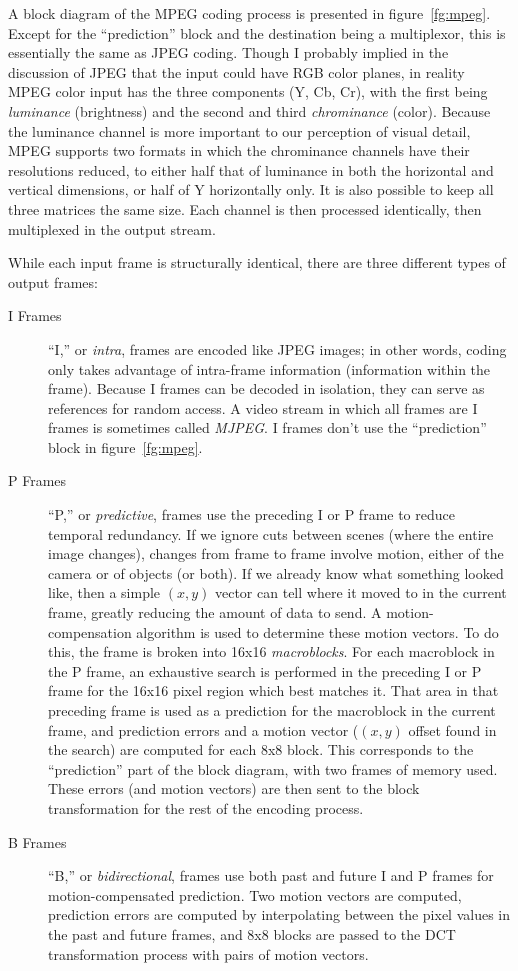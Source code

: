 A block diagram of the MPEG coding process is presented in
figure~\ref{fg:mpeg}. Except for the ``prediction'' block and the
destination being a multiplexor, this is essentially the same as JPEG
coding.  Though I probably implied in the discussion of JPEG that the
input could have RGB color planes, in reality MPEG color input has the
three components (Y, Cb, Cr), with the first being
\emph{luminance} (brightness) and the second and third
\emph{chrominance} (color). Because the luminance channel is more
important to our perception of visual detail, MPEG supports two
formats in which the chrominance channels have their resolutions
reduced, to either half that of luminance in both the horizontal and
vertical dimensions, or half of Y horizontally only. It is also
possible to keep all three matrices the same size. Each channel is
then processed identically, then multiplexed in the output stream.

While each input frame is structurally identical, there are three
different types of output frames:

\begin{description}
\item[I Frames] ``I,'' or \emph{intra}, frames are encoded like JPEG
images; in other words, coding only takes advantage of intra-frame
information (information within the frame). Because I frames can be
decoded in isolation, they can serve as references for random
access. A video stream in which all frames are I frames is sometimes
called \emph{MJPEG}. I frames don't use the ``prediction'' block in
figure~\ref{fg:mpeg}.
\item[P Frames] ``P,'' or \emph{predictive}, frames use the preceding
I or P frame to reduce temporal redundancy. If we ignore cuts between
scenes (where the entire image changes), changes from frame to frame
involve motion, either of the camera or of objects (or both). If we
already know what something looked like, then a simple $(x,y)$ vector
can tell where it moved to in the current frame, greatly reducing the
amount of data to send. A motion-compensation algorithm is used to
determine these motion vectors. To do this, the frame is broken into
16x16 \emph{macroblocks}. For each macroblock in the P frame, an
exhaustive search is performed in the preceding I or P frame for the
16x16 pixel region which best matches it. That area in that preceding
frame is used as a prediction for the macroblock in the current frame, 
and prediction errors and a motion vector ($(x,y)$ offset found in the
search) are computed for each 8x8 block. This corresponds to the
``prediction'' part of the block diagram, with two frames of memory
used. These errors (and motion vectors) are then sent to the block
transformation for the rest of the encoding process.
\item[B Frames] ``B,'' or \emph{bidirectional}, frames use both past
and future I and P frames for motion-compensated prediction. Two
motion vectors are computed, prediction errors are computed by
interpolating between the pixel values in the past and future frames,
and 8x8 blocks are passed to the DCT transformation process with pairs
of motion vectors.
\end{description}

